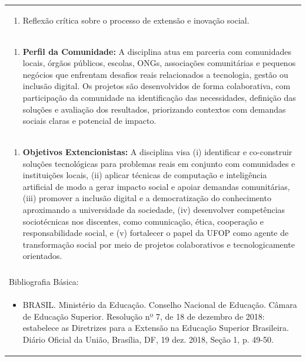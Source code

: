 \documentclass[11pt]{article}
\begin{document}
\begin{center}
\begin{longtable}{|p{4cm}|p{4cm}|p{4cm}|p{4cm}|}
\multicolumn{4}{|p{\dimexpr 16cm + 6\tabcolsep\relax}|}{\begin{enumerate}[start=10]\item Reflexão crítica sobre o processo de extensão e inovação social.\end{enumerate}}\\
\multicolumn{4}{|p{\dimexpr 16cm + 6\tabcolsep\relax}|}{\begin{enumerate}[start=11]\item \textbf{Perfil da Comunidade:} A disciplina atua em parceria com comunidades locais, órgãos públicos, escolas, ONGs, associações comunitárias e pequenos negócios que enfrentam desafios reais relacionados a tecnologia, gestão ou inclusão digital. Os projetos são desenvolvidos de forma colaborativa, com participação da comunidade na identificação das necessidades, definição das soluções e avaliação dos resultados, priorizando contextos com demandas sociais claras e potencial de impacto.\end{enumerate}}\\
\multicolumn{4}{|p{\dimexpr 16cm + 6\tabcolsep\relax}|}{\begin{enumerate}[start=12]\item \textbf{Objetivos Extencionistas:} A disciplina visa (i) identificar e co-construir soluções tecnológicas para problemas reais em conjunto com comunidades e instituições locais, (ii) aplicar técnicas de computação e inteligência artificial de modo a gerar impacto social e apoiar demandas comunitárias, (iii) promover a inclusão digital e a democratização do conhecimento aproximando a universidade da sociedade, (iv) desenvolver competências sociotécnicas nos discentes, como comunicação, ética, cooperação e responsabilidade social, e (v) fortalecer o papel da UFOP como agente de transformação social por meio de projetos colaborativos e tecnologicamente orientados.\end{enumerate}}\\
\multicolumn{4}{|p{\dimexpr 16cm + 6\tabcolsep\relax}|}{}\\
\hline
\multicolumn{4}{|p{16cm}|}{Bibliografia Básica:}\\*
\multicolumn{4}{|p{\dimexpr 16cm + 6\tabcolsep\relax}|}{\begin{itemize}\item BRASIL. Ministério da Educação. Conselho Nacional de Educação. Câmara de Educação Superior. Resolução nº 7, de 18 de dezembro de 2018: estabelece as Diretrizes para a Extensão na Educação Superior Brasileira. Diário Oficial da União, Brasília, DF, 19 dez. 2018, Seção 1, p. 49-50.\end{itemize}}\\

\end{longtable}
\end{center}
\end{document}
